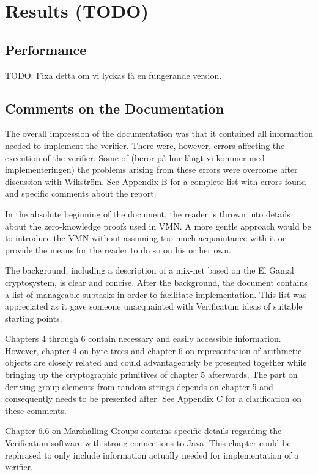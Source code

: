 \section{Results (TODO)}

\subsection{Performance}

TODO: Fixa detta om vi lyckas få en fungerande version.

\subsection{Comments on the Documentation}

The overall impression of the documentation was that it contained all
information needed to implement the verifier. There were, however,
errors affecting the execution of the verifier. Some of (beror på hur
långt vi kommer med implementeringen) the problems arising from these
errors were overcome after discussion with Wikström. See Appendix B
for a complete list with errors found and specific comments about the
report.

In the absolute beginning of the document, the reader is thrown into
details about the zero-knowledge proofs used in VMN. A more
gentle approach would be to introduce the VMN without
assuming too much acquaintance with it or provide the means for the
reader to do so on his or her own.

The background, including a description of a mix-net based on the El
Gamal cryptosystem, is clear and concise. After the background, the
document contains a list of manageable subtasks in order to facilitate
implementation. This list was appreciated as it gave someone
unacquainted with Verificatum ideas of suitable starting points.

Chapters 4 through 6 contain necessary and easily accessible
information. However, chapter 4 on byte trees and chapter 6 on
representation of arithmetic objects are closely related and could
advantageously be presented together while bringing up the
cryptographic primitives of chapter 5 afterwards. The part on deriving
group elements from random strings depends on chapter 5 and
consequently needs to be presented after. See Appendix C for a
clarification on these comments.

Chapter 6.6 on Marshalling Groups contains specific details regarding
the Verificatum software with strong connections to Java. This chapter
could be rephrased to only include information actually needed for
implementation of a verifier.

